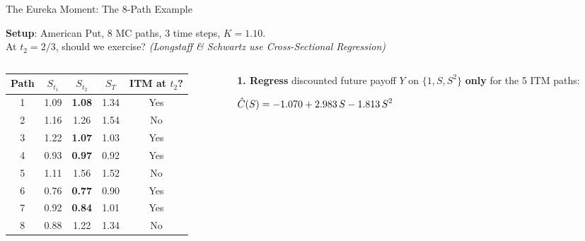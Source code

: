 \documentclass[10pt,aspectratio=169]{beamer}
\newcommand{\eqbox}[1]{%
  \begin{center}
    \vspace{-0.1cm}
    \begin{tcolorbox}[
      colback=white, colframe=mathBlue, 
      boxrule=1.0pt, arc=2pt,
      top=4pt, bottom=4pt, left=4pt, right=4pt,
      width=0.9\linewidth, 
      halign=center, nobeforeafter
    ]
      $\displaystyle \fontsize{10}{13}\selectfont #1$
    \end{tcolorbox}
    \vspace{-0.1cm}
  \end{center}
}
\begin{document}
\begin{frame}{The Eureka Moment: The 8-Path Example}

\textbf{Setup}: American Put, 8 MC paths, 3 time steps, $K=1.10$. \\
At $t_2 = 2/3$, should we exercise? \textit{(Longstaff \& Schwartz use Cross-Sectional Regression)}

\vspace{0.2cm}
\begin{columns}[T]
\begin{column}{0.48\textwidth}
\begin{center}
\footnotesize
\renewcommand{\arraystretch}{1.1}
\setlength{\tabcolsep}{4pt}
\begin{tabular}{c|ccc|c}
\toprule
\textbf{Path} & $S_{t_1}$ & $S_{t_2}$ & $S_{T}$ & \textbf{ITM at $t_2$?} \\
\midrule
1 & 1.09 & \textcolor{itmGreen}{\textbf{1.08}} & 1.34 & \textcolor{itmGreen}{Yes} \\
2 & 1.16 & 1.26 & 1.54 & No \\
3 & 1.22 & \textcolor{itmGreen}{\textbf{1.07}} & 1.03 & \textcolor{itmGreen}{Yes} \\
4 & 0.93 & \textcolor{itmGreen}{\textbf{0.97}} & 0.92 & \textcolor{itmGreen}{Yes} \\
5 & 1.11 & 1.56 & 1.52 & No \\
6 & 0.76 & \textcolor{itmGreen}{\textbf{0.77}} & 0.90 & \textcolor{itmGreen}{Yes} \\
7 & 0.92 & \textcolor{itmGreen}{\textbf{0.84}} & 1.01 & \textcolor{itmGreen}{Yes} \\
8 & 0.88 & 1.22 & 1.34 & No \\
\bottomrule
\end{tabular}
\end{center}
\end{column}

\begin{column}{0.50\textwidth}
\footnotesize
\textbf{1. Regress} discounted future payoff $Y$ on $\{1, S, S^2\}$ \textbf{only} for the 5 ITM paths:
\vspace{-0.1cm}
\eqbox{
  \hat{C}(S) = -1.070 + 2.983\,S - 1.813\,S^2
}


\end{column}
\end{columns}
\end{frame}
\end{document}
